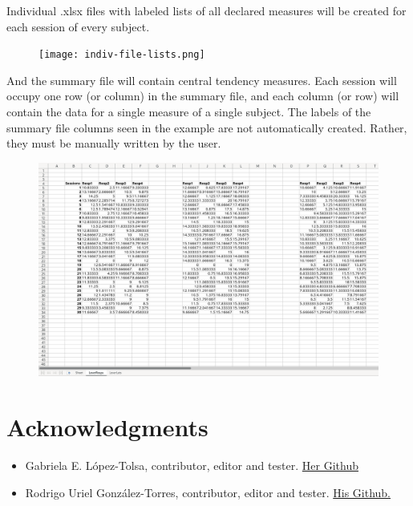 \documentclass[a4paper,12pt]{article}
\begin{document}
Individual .xlsx files with labeled lists of all declared measures will be created for each session of every subject.

\begin{figure}[!ht]
    \begin{center}
        \texttt{[image: indiv-file-lists.png]}
    \end{center}
\end{figure}

And the summary file will contain central tendency measures. Each session will occupy one row (or column) in the summary file, and each column (or row) will contain the data for a single measure of a single subject. The labels of the summary file columns seen in the example are not automatically created. Rather, they must be manually written by the user.

\begin{figure}[!ht]
    \begin{center}
        \includegraphics[scale=0.35]{summary-file.png}
    \end{center}
\end{figure}

\newpage
\section{Acknowledgments}

\begin{itemize}
    \item Gabriela E. López-Tolsa, contributor, editor and tester. \href{https://github.com/GELopezTolsa}{Her Github}
\item Rodrigo Uriel González-Torres, contributor, editor and tester. \href{https://github.com/RodrigoUriGT}{His Github.}
\end{itemize}
\end{document}
